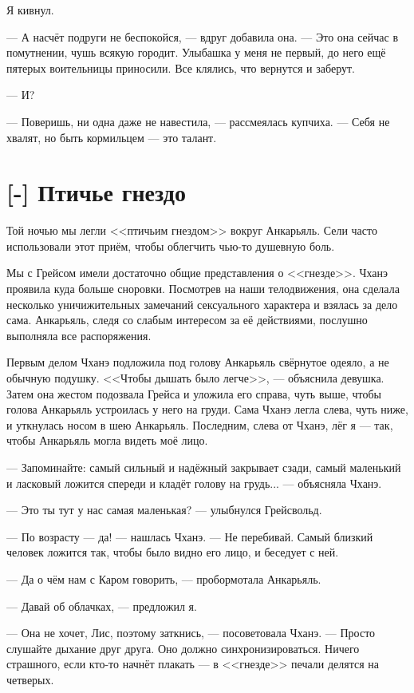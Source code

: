 Я кивнул.

--- А насчёт подруги не беспокойся, --- вдруг добавила она.
--- Это она сейчас в помутнении, чушь всякую городит.
Улыбашка у меня не первый, до него ещё пятерых воительницы приносили.
Все клялись, что вернутся и заберут.

--- И?

--- Поверишь, ни одна даже не навестила, --- рассмеялась купчиха.
--- Себя не хвалят, но быть кормильцем --- это талант.

\section{[-] Птичье гнездо}

Той ночью мы легли <<птичьим гнездом>> вокруг Анкарьяль.
Сели часто использовали этот приём, чтобы облегчить чью-то душевную боль.

Мы с Грейсом имели достаточно общие представления о <<гнезде>>.
Чханэ проявила куда больше сноровки.
Посмотрев на наши телодвижения, она сделала несколько уничижительных замечаний сексуального характера и взялась за дело сама.
Анкарьяль, следя со слабым интересом за её действиями, послушно выполняла все распоряжения.

Первым делом Чханэ подложила под голову Анкарьяль свёрнутое одеяло, а не обычную подушку.
<<Чтобы дышать было легче>>, --- объяснила девушка.
Затем она жестом подозвала Грейса и уложила его справа, чуть выше, чтобы голова Анкарьяль устроилась у него на груди.
Сама Чханэ легла слева, чуть ниже, и уткнулась носом в шею Анкарьяль.
Последним, слева от Чханэ, лёг я --- так, чтобы Анкарьяль могла видеть моё лицо.

--- Запоминайте: самый сильный и надёжный закрывает сзади, самый маленький и ласковый ложится спереди и кладёт голову на грудь... --- объясняла Чханэ.

--- Это ты тут у нас самая маленькая? --- улыбнулся Грейсвольд.

--- По возрасту --- да! --- нашлась Чханэ.
--- Не перебивай.
Самый близкий человек ложится так, чтобы было видно его лицо, и беседует с ней.

--- Да о чём нам с Каром говорить, --- пробормотала Анкарьяль.

--- Давай об облачках, --- предложил я.

--- Она не хочет, Лис, поэтому заткнись, --- посоветовала Чханэ.
--- Просто слушайте дыхание друг друга.
Оно должно синхронизироваться.
Ничего страшного, если кто-то начнёт плакать --- в <<гнезде>> печали делятся на четверых.

